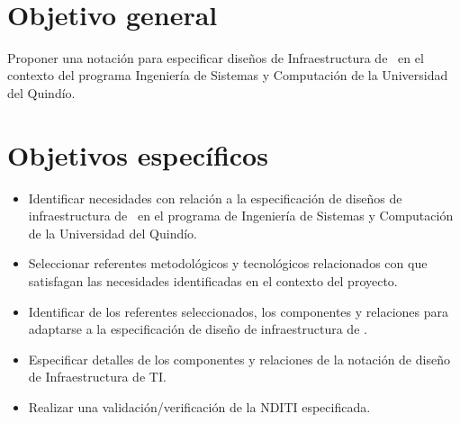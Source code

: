 \label{cap:objetivos}
\mbox{}\\


\section{Objetivo general}\label{cap:objetivoGeneral}

Proponer una notación para especificar diseños de Infraestructura de \TI~en el contexto del programa Ingeniería de Sistemas y Computación de la Universidad del Quindío.


\section{Objetivos específicos}\label{cap:objetivosEspecificos}
\begin{itemize}
	\item Identificar necesidades con relación a la especificación de diseños de infraestructura de \TI~en el programa de Ingeniería de Sistemas y Computación de la Universidad del Quindío.

	\item Seleccionar referentes metodológicos y tecnológicos relacionados con \NDITI que satisfagan las necesidades identificadas en el contexto del proyecto.

	\item Identificar de los referentes seleccionados, los componentes y relaciones para adaptarse a la especificación de diseño de infraestructura de \TI.

	\item Especificar detalles de los componentes y relaciones de la notación de diseño de Infraestructura de TI.

	\item Realizar una validación/verificación de la NDITI especificada.
\end{itemize}
